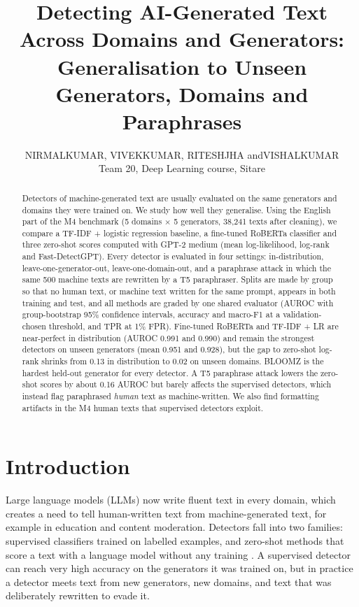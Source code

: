 \documentclass[11pt,a4paper]{article}
\title[Detecting AI-Generated Text Across Domains and Generators]
      {Detecting AI-Generated Text Across Domains and Generators:\\
       Generalisation to Unseen Generators, Domains and Paraphrases}
\author[N.\ Kumar and others]
       {N\ls I\ls R\ls M\ls A\ls L\ns K\ls U\ls M\ls A\ls R,\ns
        V\ls I\ls V\ls E\ls K\ns K\ls U\ls M\ls A\ls R,\ns
        R\ls I\ls T\ls E\ls S\ls H\ns J\ls H\ls A\ns
        and\ns V\ls I\ls S\ls H\ls A\ls L\ns K\ls U\ls M\ls A\ls R\\
        Team 20, Deep Learning course, Sitare}
\begin{document}
\label{firstpage}
\maketitle

\begin{abstract}
Detectors of machine-generated text are usually evaluated on the same generators and domains they were trained on.
We study how well they generalise. Using the English part of the M4 benchmark (5 domains $\times$ 5 generators,
38,241 texts after cleaning), we compare a TF-IDF + logistic regression baseline, a fine-tuned RoBERTa classifier and
three zero-shot scores computed with GPT-2 medium (mean log-likelihood, log-rank and Fast-DetectGPT). Every detector is
evaluated in four settings: in-distribution, leave-one-generator-out, leave-one-domain-out, and a paraphrase attack
in which the same 500 machine texts are rewritten by a T5 paraphraser. Splits are made by group so that no human text,
or machine text written for the same prompt, appears in both training and test, and all methods are graded by one
shared evaluator (AUROC with group-bootstrap 95\% confidence intervals, accuracy and macro-F1 at a validation-chosen
threshold, and TPR at 1\% FPR). Fine-tuned RoBERTa and TF-IDF + LR are near-perfect in distribution (AUROC 0.991 and 0.990) and remain the strongest
detectors on unseen generators (mean 0.951 and 0.928), but the gap to zero-shot log-rank shrinks from 0.13 in
distribution to 0.02 on unseen domains. BLOOMZ is the hardest held-out generator for every detector. A T5 paraphrase
attack lowers the zero-shot scores by about 0.16 AUROC but barely affects the supervised detectors, which instead
flag paraphrased \emph{human} text as machine-written. We also find formatting artifacts in the M4 human texts that
supervised detectors exploit.
\end{abstract}

\section{Introduction}

Large language models (LLMs) now write fluent text in every domain, which creates a need to tell human-written text
from machine-generated text, for example in education and content moderation. Detectors fall into two families:
supervised classifiers trained on labelled examples, and zero-shot methods that score a text with a language model
without any training \citep{mitchell23}. A supervised detector can reach very high accuracy on the generators it was
trained on, but in practice a detector meets text from new generators, new domains, and text that was deliberately
rewritten to evade it.
\end{document}
